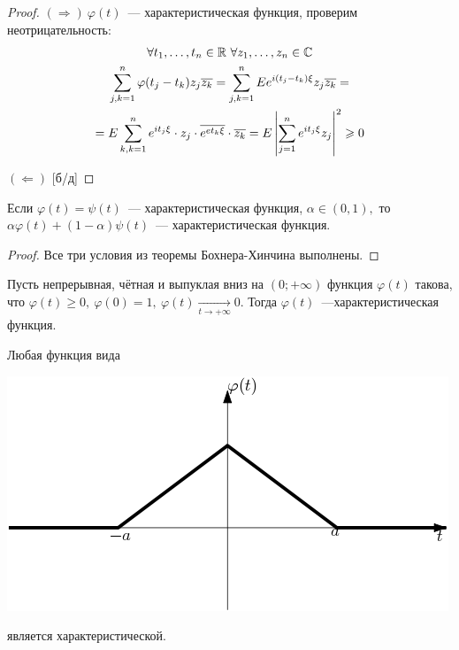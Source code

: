 	\begin{proof}
		\((\Rightarrow) ~ \varphi(t)\)~--- характеристическая функция, проверим неотрицательность:
		\begin{gather*}
			\forall t_1, \ldots, t_n \in \mathbb{R}~\forall z_1, \ldots, z_n \in \mathbb{C}\\
			\sum\limits_{j, k = 1}^{n}\varphi(t_j - t_k)z_j \overline{z_k} =
			\sum\limits_{j, k = 1}^{n}Ee^{i(t_j - t_k)\xi}z_j\overline{z_k} = \\
			= E \sum\limits_{k, k = 1}^{n}e^{it_j\xi}\cdot z_j \cdot \overline{e^{et_k\xi}}\cdot \overline{z_k} = E\left|\sum\limits_{j = 1}^{n} e^{it_j\xi}z_j\right|^2 \geqslant 0
		\end{gather*}
	
		\((\Leftarrow)\) [б/д]
	\end{proof}
	\begin{consequence}
		Если \(\varphi(t) = \psi(t)\)~--- характеристическая функция, \(\alpha \in (0, 1),\) то \(\alpha \varphi(t) + (1 - \alpha)\psi(t)\)~--- характеристическая функция.
	\end{consequence}
	\begin{proof}
		Все три условия из теоремы Бохнера-Хинчина выполнены.
	\end{proof}
	\begin{theorem}[Пойа(б/д)]
		Пусть непрерывная, чётная и выпуклая вниз на \((0; + \infty)\) функция \(\varphi(t)\) такова, что \(\varphi(t) \geqslant 0, ~ \varphi(0) = 1, ~\varphi(t) \underset{t \to +\infty}{\longrightarrow} 0\). Тогда \(\varphi(t)\)~---характеристическая функция.
	\end{theorem}

	\begin{example}
		Любая функция вида
		\begin{center}
			\includegraphics[scale=0.4]{img/img1.png}
		\end{center}
		является характеристической.
	\end{example}

